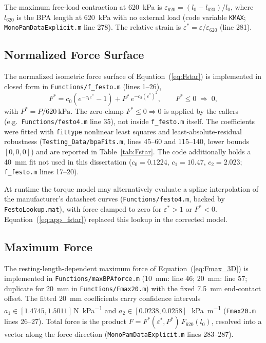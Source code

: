 The maximum free-load contraction at \qty{620}{\kPa} is $\varepsilon_{620} = (l_{0}-l_{620})/l_{0}$, where $l_{620}$ is the BPA length at \qty{620}{\kPa} with no external load (code variable \texttt{KMAX}; \texttt{MonoPamDataExplicit.m} line 278). The relative strain is $\varepsilon^{*} = \varepsilon / \varepsilon_{620}$ (line 281).

\subsection{Normalized Force Surface}
The normalized isometric force surface of Equation~(\ref{eq:Fstar}) is implemented in closed form in \nolinkurl{Functions/f_festo.m} (lines 1--26),
\begin{equation}
    F^{*} = c_{0}\left(e^{-c_{1}\varepsilon^{*}} - 1\right)
            + P^{*}\,e^{-c_{2}(\varepsilon^{*})^{2}},
    \qquad F^{*}\le 0 \;\Rightarrow\; 0,
    \label{eq:app_fstar}
\end{equation}
with $P^{*} = P/\qty{620}{\kPa}$. The zero-clamp $F^{*}\le 0 \Rightarrow 0$ is applied by the callers (e.g.\ \nolinkurl{Functions/festo4.m} line 35), not inside \nolinkurl{f_festo.m} itself. The coefficients were fitted with \texttt{fittype} nonlinear least squares and least-absolute-residual robustness (\nolinkurl{Testing_Data/bpaFits.m}, lines 45--60 and 115--140, lower bounds $[0,0,0]$) and are reported in Table~\ref{tab:Fstar}. The code additionally holds a \qty{40}{\mm} fit not used in this dissertation ($c_0 = 0.1224$, $c_1 = 10.47$, $c_2 = 2.023$; \nolinkurl{f_festo.m} lines 17--20).

At runtime the torque model may alternatively evaluate a spline interpolation of the manufacturer's datasheet curves (\nolinkurl{Functions/festo4.m}, backed by \texttt{FestoLookup.mat}), with force clamped to zero for $\varepsilon^{*}>1$ or $F^{*}<0$. Equation~(\ref{eq:app_fstar}) replaced this lookup in the corrected model.

\subsection{Maximum Force}
The resting-length-dependent maximum force of Equation~(\ref{eq:Fmax_3D}) is implemented in \nolinkurl{Functions/maxBPAforce.m} (\qty{10}{\mm}: line 46; \qty{20}{\mm}: line 57; duplicate for \qty{20}{\mm} in \nolinkurl{Functions/Fmax20.m}) with the fixed \qty{7.5}{\mm} end-contact offset. The fitted \qty{20}{\mm} coefficients carry confidence intervals $a_1 \in [1.4745, 1.5011]$\,\si{\N\per\kPa} and $a_2 \in [0.0238, 0.0258]$\,\si{\per\kPa\per\metre} (\texttt{Fmax20.m} lines 26--27). Total force is the product $F = F^{*}(\varepsilon^{*},P^{*})\,F_{620}(l_{0})$, resolved into a vector along the force direction (\texttt{MonoPamDataExplicit.m} lines 283--287).

